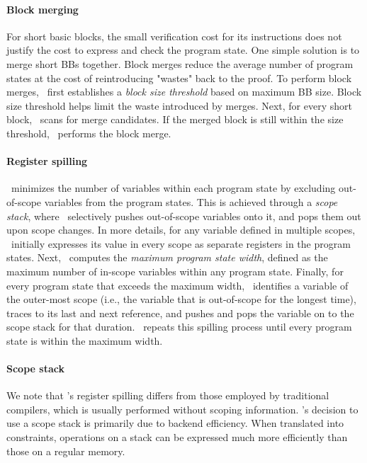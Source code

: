 
\paragraph{Block merging} For short basic blocks, the small verification cost for its instructions does not justify the cost to express and check the program state. One simple solution is to merge short BBs together. Block merges reduce the average number of program states at the cost of reintroducing "wastes" back to the proof. To perform block merges, \CoBBl~first establishes a \emph{block size threshold} based on maximum BB size. Block size threshold helps limit the waste introduced by merges. Next, for every short block, \CoBBl~scans for merge candidates. If the merged block is still within the size threshold, \CoBBl~performs the block merge.

\paragraph{Register spilling} \CoBBl~minimizes the number of variables within each program state by excluding out-of-scope variables from the program states. This is achieved through a \emph{scope stack}, where \CoBBl~selectively pushes out-of-scope variables onto it, and pops them out upon scope changes. In more details, for any variable defined in multiple scopes, \CoBBl~initially expresses its value in every scope as separate registers in the program states. Next, \CoBBl~computes the \emph{maximum program state width}, defined as the maximum number of in-scope variables within any program state. Finally, for every program state that exceeds the maximum width, \CoBBl~identifies a variable of the outer-most scope (i.e., the variable that is out-of-scope for the longest time), traces to its last and next reference, and pushes and pops the variable on to the scope stack for that duration. \CoBBl~repeats this spilling process until every program state is within the maximum width.

\paragraph{Scope stack} We note that \CoBBl's register spilling differs from those employed by traditional compilers, which is usually performed without scoping information. \CoBBl's decision to use a scope stack is primarily due to backend efficiency. When translated into constraints, operations on a stack can be expressed much more efficiently than those on a regular memory.

